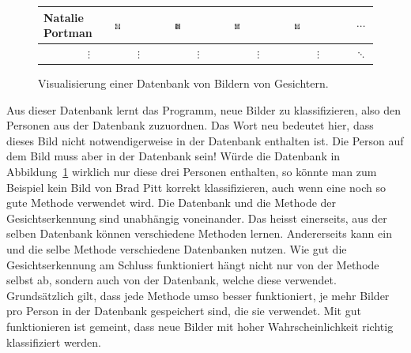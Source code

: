 \begin{figure}[ht]
\begin{tabular}{l m{2cm} m{2cm} m{2cm} m{2cm} c}
		Natalie Portman & \includegraphics[width=0.1\textwidth]{images/intro/class2_0} & \includegraphics[width=0.1\textwidth]{images/intro/class2_1} & \includegraphics[width=0.1\textwidth]{images/intro/class2_2} & \includegraphics[width=0.1\textwidth]{images/intro/class2_3} & $\cdots$ \\ \hline
		$\qquad\qquad\vdots$ & $\qquad\vdots$ & $\qquad\vdots$ & $\qquad\vdots$ & $\qquad\vdots$ & $\ddots$ \\
	\end{tabular}
	\caption{Visualisierung einer Datenbank von Bildern von Gesichtern.}
	\label{fig:database}
\end{figure}
Aus dieser Datenbank \glqq{}lernt\grqq{} das Programm, neue Bilder zu klassifizieren, also den Personen aus der Datenbank zuzuordnen.
Das Wort \glqq{}neu\grqq{} bedeutet hier, dass dieses Bild nicht notwendigerweise in der Datenbank enthalten ist.
Die Person auf dem Bild muss aber in der Datenbank sein!
Würde die Datenbank in Abbildung~\ref{fig:database} wirklich nur diese drei Personen enthalten, so könnte man zum Beispiel kein Bild von Brad Pitt korrekt klassifizieren, auch wenn eine noch so gute Methode verwendet wird.
Die Datenbank und die Methode der Gesichtserkennung sind unabhängig voneinander.
Das heisst einerseits, aus der selben Datenbank können verschiedene Methoden lernen.
Andererseits kann ein und die selbe Methode verschiedene Datenbanken nutzen.
Wie gut die Gesichtserkennung am Schluss funktioniert hängt nicht nur von der Methode selbst ab, sondern auch von der Datenbank, welche diese verwendet.
Grundsätzlich gilt, dass jede Methode umso besser funktioniert, je mehr Bilder pro Person in der Datenbank gespeichert sind, die sie verwendet.
Mit \glqq{}gut funktionieren\grqq{} ist gemeint, dass neue Bilder mit hoher Wahrscheinlichkeit richtig klassifiziert werden.

